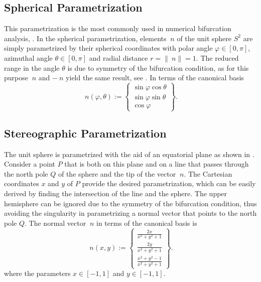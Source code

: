\documentclass[12pt]{article}
\numberwithin{equation}{section}
\begin{document}
\subsection{Spherical Parametrization}
\label{subsec:spherical}

This parametrization is the most commonly used in numerical
bifurcation analysis, \eg \cite{Mosler:2005, Regueiro.Foster:2011}.
In the spherical parametrization, elements $~n$ of the unit sphere
$S^2$ are simply parametrized by their spherical coordinates with
polar angle $\varphi \in [0, \pi]$, azimuthal angle $\theta \in [0,
  \pi]$ and radial distance $r = \|~n \| = 1$. The reduced range in
the angle $\theta$ is due to symmetry of the bifurcation condition, as
for this purpose $~n$ and $- ~n$ yield the same result, see
. In terms of the canonical basis
\begin{equation}
  ~n(\varphi, \theta)
  :=
  \begin{Bmatrix}
    \sin\varphi \cos\theta
    \\
    \sin\varphi \sin\theta
    \\
    \cos\varphi
  \end{Bmatrix}.
\end{equation}

\subsection{Stereographic Parametrization}
\label{subsec:stereographic}

The unit sphere is parametrized with the aid of an equatorial plane as
shown in .  Consider a point $P$ that is both
on this plane and on a line that passes through the north pole $Q$ of
the sphere and the tip of the vector $~n$. The Cartesian coordinates
$x$ and $y$ of $P$ provide the desired parametrization, which can be
easily derived by finding the intersection of the line and the
sphere. The upper hemisphere can be ignored due to the symmetry of the
bifurcation condition, thus avoiding the singularity in parametrizing
a normal vector that points to the north pole $Q$. The normal vector
$~n$ in terms of the canonical basis is
\begin{equation}
  ~n(x,y)
  :=
  \begin{Bmatrix}
    \frac{\displaystyle 2x}{\displaystyle x^2+y^2+1}
    \\[0.9em]
    \frac{\displaystyle 2y}{\displaystyle x^2+y^2+1}
    \\[0.9em]
    \frac{\displaystyle x^2+y^2-1}{\displaystyle x^2+y^2+1}
  \end{Bmatrix}.
\end{equation}
where the parameters $x \in [-1, 1]$ and $y \in [-1, 1]$.
\end{document}

